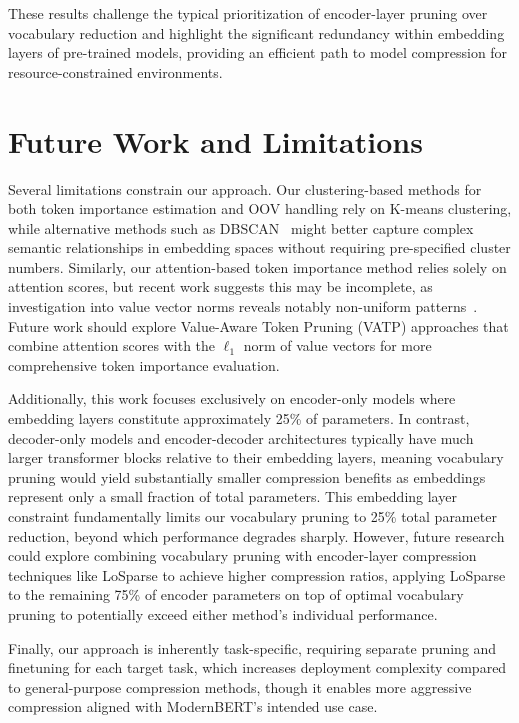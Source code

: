 \documentclass[twocolumn]{article}
\begin{document}
These results challenge the typical prioritization of encoder-layer pruning over vocabulary reduction and highlight the significant redundancy within embedding layers of pre-trained models, providing an efficient path to model compression for resource-constrained environments.

\section{Future Work and Limitations}
Several limitations constrain our approach. 
Our clustering-based methods for both token importance estimation and OOV handling rely on K-means clustering, while alternative methods such as DBSCAN~\cite{wang2019dbscan} might better capture complex semantic relationships in embedding spaces without requiring pre-specified cluster numbers.
Similarly, our attention-based token importance method relies solely on attention scores, but recent work suggests this may be incomplete, as investigation into value vector norms reveals notably non-uniform patterns~\cite{guo2024attention}. Future work should explore Value-Aware Token Pruning (VATP) approaches that combine attention scores with the $\ell_1$ norm of value vectors for more comprehensive token importance evaluation. 

Additionally, this work focuses exclusively on encoder-only models where embedding layers constitute approximately 25\% of parameters. In contrast, decoder-only models and encoder-decoder architectures typically have much larger transformer blocks relative to their embedding layers, meaning vocabulary pruning would yield substantially smaller compression benefits as embeddings represent only a small fraction of total parameters. 
This embedding layer constraint fundamentally limits our vocabulary pruning to 25\% total parameter reduction, beyond which performance degrades sharply. However, future research could explore combining vocabulary pruning with encoder-layer compression techniques like LoSparse to achieve higher compression ratios, applying LoSparse to the remaining 75\% of encoder parameters on top of optimal vocabulary pruning to potentially exceed either method's individual performance.

Finally, our approach is inherently task-specific, requiring separate pruning and finetuning for each target task, which increases deployment complexity compared to general-purpose compression methods, though it enables more aggressive compression aligned with ModernBERT's intended use case.


{\footnotesize


}
\end{document}
